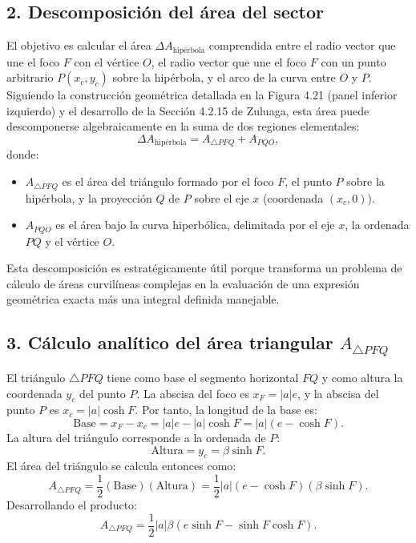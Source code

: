 \documentclass[12pt, a4paper]{article}
\begin{document}
\subsection*{2. Descomposición del área del sector}
El objetivo es calcular el área $\Delta A_{\text{hipérbola}}$ comprendida entre el radio vector que une el foco $F$ con el vértice $O$, el radio vector que une el foco $F$ con un punto arbitrario $P(x_c, y_c)$ sobre la hipérbola, y el arco de la curva entre $O$ y $P$. Siguiendo la construcción geométrica detallada en la Figura 4.21 (panel inferior izquierdo) y el desarrollo de la Sección 4.2.15 de Zuluaga, esta área puede descomponerse algebraicamente en la suma de dos regiones elementales:
$$
\Delta A_{\text{hipérbola}} = A_{\triangle PFQ} + A_{PQO},
$$
donde:
\begin{itemize}
    \item $A_{\triangle PFQ}$ es el área del triángulo formado por el foco $F$, el punto $P$ sobre la hipérbola, y la proyección $Q$ de $P$ sobre el eje $x$ (coordenada $(x_c, 0)$).
    \item $A_{PQO}$ es el área bajo la curva hiperbólica, delimitada por el eje $x$, la ordenada $PQ$ y el vértice $O$.
\end{itemize}
Esta descomposición es estratégicamente útil porque transforma un problema de cálculo de áreas curvilíneas complejas en la evaluación de una expresión geométrica exacta más una integral definida manejable.

\subsection*{3. Cálculo analítico del área triangular $A_{\triangle PFQ}$}
El triángulo $\triangle PFQ$ tiene como base el segmento horizontal $FQ$ y como altura la coordenada $y_c$ del punto $P$. La abscisa del foco es $x_F = |a|e$, y la abscisa del punto $P$ es $x_c = |a|\cosh F$. Por tanto, la longitud de la base es:
$$
\text{Base} = x_F - x_c = |a|e - |a|\cosh F = |a|(e - \cosh F).
$$
La altura del triángulo corresponde a la ordenada de $P$:
$$
\text{Altura} = y_c = \beta\sinh F.
$$
El área del triángulo se calcula entonces como:
$$
A_{\triangle PFQ} = \frac{1}{2} (\text{Base}) (\text{Altura}) = \frac{1}{2} |a| (e - \cosh F) (\beta\sinh F).
$$
Desarrollando el producto:
$$
A_{\triangle PFQ} = \frac{1}{2} |a|\beta \left( e\sinh F - \sinh F \cosh F \right).
$$
\end{document}

